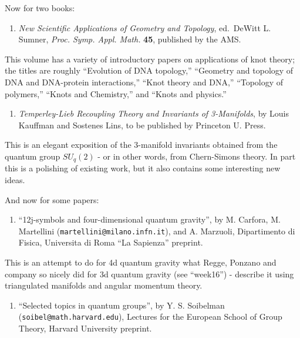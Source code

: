 \documentclass{article}
\def\tightlist{}
\begin{document}
Now for two books:

\begin{enumerate}
\def\labelenumi{\arabic{enumi})}
\setcounter{enumi}{1}
\tightlist
\item
  \emph{New Scientific Applications of Geometry and Topology},
  ed.~DeWitt L. Sumner, \emph{Proc. Symp. Appl. Math.} \textbf{45},
  published by the AMS.
\end{enumerate}

This volume has a variety of introductory papers on applications of knot
theory; the titles are roughly ``Evolution of DNA topology,'' ``Geometry
and topology of DNA and DNA-protein interactions,'' ``Knot theory and
DNA,'' ``Topology of polymers,'' ``Knots and Chemistry,'' and ``Knots
and physics.''

\begin{enumerate}
\def\labelenumi{\arabic{enumi})}
\setcounter{enumi}{2}
\tightlist
\item
  \emph{Temperley-Lieb Recoupling Theory and Invariants of 3-Manifolds},
  by Louis Kauffman and Sostenes Lins, to be published by Princeton U.
  Press.
\end{enumerate}

This is an elegant exposition of the 3-manifold invariants obtained from
the quantum group \(SU_q(2)\) - or in other words, from Chern-Simons
theory. In part this is a polishing of existing work, but it also
contains some interesting new ideas.

And now for some papers:

\begin{enumerate}
\def\labelenumi{\arabic{enumi})}
\setcounter{enumi}{3}
\tightlist
\item
  ``12j-symbols and four-dimensional quantum gravity'', by M. Carfora,
  M. Martellini (\texttt{martellini@milano.infn.it}), and A. Marzuoli,
  Dipartimento di Fisica, Universita di Roma ``La Sapienza'' preprint.
\end{enumerate}

This is an attempt to do for 4d quantum gravity what Regge, Ponzano and
company so nicely did for 3d quantum gravity (see ``week16'') - describe
it using triangulated manifolds and angular momentum theory.

\begin{enumerate}
\def\labelenumi{\arabic{enumi})}
\setcounter{enumi}{4}
\tightlist
\item
  ``Selected topics in quantum groups'', by Y. S. Soibelman
  (\texttt{soibel@math.harvard.edu}), Lectures for the European School
  of Group Theory, Harvard University preprint.
\end{enumerate}
\end{document}
